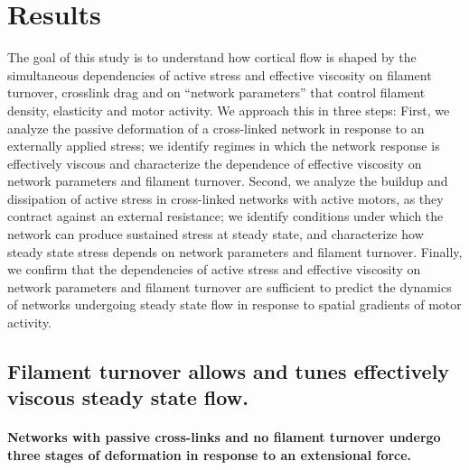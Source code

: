 \section{Results}
The goal of this study is to understand how cortical flow is shaped by the simultaneous dependencies of active stress and effective viscosity on filament turnover, crosslink drag and on ``network parameters'' that control  filament density, elasticity and motor activity.   We approach this in three steps: First, we analyze the passive deformation of a cross-linked network in response to an externally applied stress; we identify regimes in which the network response is effectively viscous and characterize the dependence of effective viscosity on network parameters and filament turnover.  Second, we analyze the buildup and dissipation of active stress in cross-linked networks with active motors, as they contract against an external resistance; we identify conditions under which the network can produce sustained stress at steady state, and characterize how steady state stress depends on network parameters and filament turnover. Finally, we confirm that the dependencies of active stress and effective viscosity on network parameters and filament turnover are sufficient to predict the dynamics of networks undergoing steady state flow in response to spatial gradients of motor activity.
\subsection{Filament turnover allows and tunes effectively viscous steady state flow.}

\paragraph{Networks with passive cross-links and no filament turnover undergo three stages of deformation in response to an extensional force.} 

